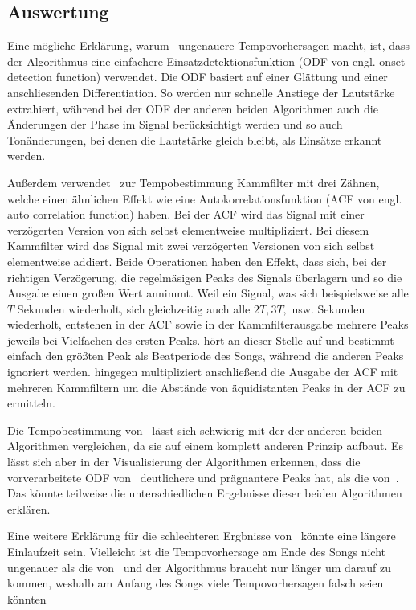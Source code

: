 {	\subsection{Auswertung}
	{

		Eine mögliche Erklärung,
			warum~\cite{2001_BeatThis} ungenauere Tempovorhersagen macht,
			ist,
			dass der Algorithmus eine einfachere Einsatzdetektionsfunktion (ODF von engl. onset detection function) verwendet.
		Die ODF basiert auf einer Glättung und einer anschliesenden Differentiation.
		So werden nur schnelle Anstiege der Lautstärke extrahiert,
			während bei der ODF der anderen beiden Algorithmen auch die Änderungen der Phase im Signal berücksichtigt werden
			und so auch Tonänderungen,
			bei denen die Lautstärke gleich bleibt,
			als Einsätze erkannt werden.

		Außerdem verwendet~\cite{2001_BeatThis} zur Tempobestimmung Kammfilter mit drei Zähnen,
			welche einen ähnlichen Effekt wie eine Autokorrelationsfunktion (ACF von engl. auto correlation function) haben.
		Bei der ACF wird das Signal mit einer verzögerten Version von sich selbst elementweise multipliziert.
		Bei diesem Kammfilter wird das Signal mit zwei verzögerten Versionen von sich selbst elementweise addiert.
		Beide Operationen haben den Effekt,
			dass sich,
			bei der richtigen Verzögerung,
			die regelmäsigen Peaks des Signals überlagern
			und so die Ausgabe einen großen Wert annimmt.
		Weil ein Signal,
			was sich beispielsweise alle $T$ Sekunden wiederholt,
			sich gleichzeitig auch alle $2T, 3T,$ usw. Sekunden wiederholt,
			entstehen in der ACF sowie in der Kammfilterausgabe mehrere Peaks jeweils bei Vielfachen des ersten Peaks.
		\cite{2001_BeatThis} hört an dieser Stelle auf
			und bestimmt einfach den größten Peak als Beatperiode des Songs,
			während die anderen Peaks ignoriert werden.
		\cite{2009_DaPlSt} hingegen multipliziert anschließend die Ausgabe der ACF mit mehreren Kammfiltern
			um die Abstände von äquidistanten Peaks in der ACF zu ermitteln.

		Die Tempobestimmung von~\cite{2011_PlRoSt} lässt sich schwierig mit der der anderen beiden Algorithmen vergleichen,
			da sie auf einem komplett anderen Prinzip aufbaut.
		Es lässt sich aber in der Visualisierung der Algorithmen erkennen,
			dass die vorverarbeitete ODF von~\cite{2009_DaPlSt} deutlichere und prägnantere Peaks hat,
			als die von~\cite{2011_PlRoSt}.
		Das könnte teilweise die unterschiedlichen Ergebnisse dieser beiden Algorithmen erklären.

		Eine weitere Erklärung für die schlechteren Ergbnisse von~\cite{2011_PlRoSt} könnte eine längere Einlaufzeit sein.
		Vielleicht ist die Tempovorhersage am Ende des Songs nicht ungenauer als die von~\cite{2009_DaPlSt}
			und der Algorithmus braucht nur länger um darauf zu kommen,
			weshalb am Anfang des Songs viele Tempovorhersagen falsch seien könnten
	}
}

